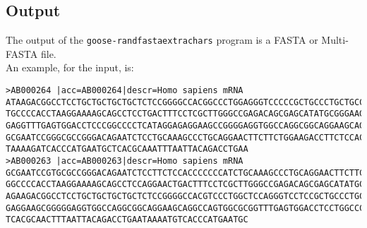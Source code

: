 \subsection*{Output}
The output of the \texttt{goose-randfastaextrachars} program is a FASTA or Multi-FASTA file.\\
An example, for the input, is:
\begin{lstlisting}
>AB000264 |acc=AB000264|descr=Homo sapiens mRNA 
ATAAGACGGCCTCCTGCTGCTGCTGCTCTCCGGGGCCACGGCCCTGGAGGGTCCCCCGCTGCCCTGCTGCCATTGTCCCC
TGCCCCACCTAAGGAAAAGCAGCCTCCTGACTTTCCTCGCTTGGGCCGAGACAGCGAGCATATGCGGGAAGCGGCAGGAA
GAGGTTTGAGTGGACCTCCCGGCCCCTCATAGGAGAGGAAGCCGGGGAGGTGGCCAGGCGGCAGGAAGCAGGCCAGTGTC
GCGAATCCGGGCGCCGGGACAGAATCTCCTGCAAAGCCCTGCAGGAACTTCTTCTGGAAGACCTTCTCCACCCCCCCTTG
TAAAAGATCACCCATGAATGCTCACGCAAATTTAATTACAGACCTGAA
>AB000263 |acc=AB000263|descr=Homo sapiens mRNA 
GCGAATCCGTGCGCCGGGACAGAATCTCCTTCTCCACCCCCCCATCTGCAAAGCCCTGCAGGAACTTCTTCTGGAAGACC
GGCCCCACCTAAGGAAAAGCAGCCTCCAGGAACTGACTTTCCTCGCTTGGGCCGAGACAGCGAGCATATGCGGGAAGCGG
AGAAGACGGCCTCCTGCTGCTGCTGCTCTCCGGGGCCACGTCCCTGGCTCCAGGGTCCTCCGCTGCCCTGCTGCCATTGC
GAGGAAGCGGGGGAGGTGGCCAGGCGGCAGGAAGCAGGCCAGTGGCGCGGTTTGAGTGGACCTCCTGGCCCCTCATAGGA
TCACGCAACTTTAATTACAGACCTGAATAAAATGTCACCCATGAATGC
\end{lstlisting}